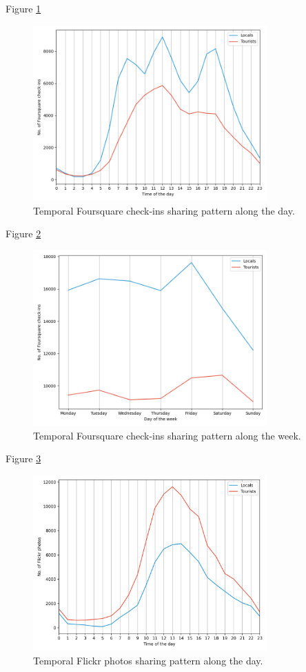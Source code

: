 \documentclass{article}
\begin{document}
Figure \ref{fig:foursquare_trend_day}
\begin{figure}
\centering
\includegraphics[width=0.8\textwidth]{figures/foursquare_trend_day.png}
\caption{\label{fig:foursquare_trend_day}Temporal Foursquare check-ins sharing pattern along the day.}
\end{figure}

Figure \ref{fig:foursquare_trend_week}
\begin{figure}
\centering
\includegraphics[width=0.8\textwidth]{figures/foursquare_trend_week.png}
\caption{\label{fig:foursquare_trend_week}Temporal Foursquare check-ins sharing pattern along the week.}
\end{figure}


Figure \ref{fig:flickr_trend_day}
\begin{figure}
\centering
\includegraphics[width=0.8\textwidth]{figures/flickr_trend_day.png}
\caption{\label{fig:flickr_trend_day}Temporal Flickr photos sharing pattern along the day.}
\end{figure}
\end{document}
